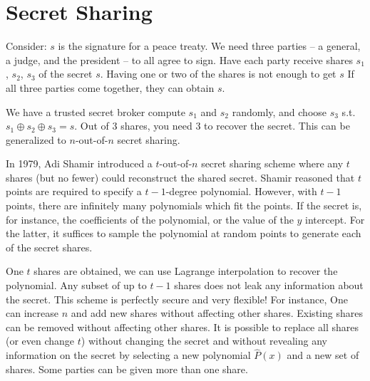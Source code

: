 \section{Secret Sharing}

Consider: $s$ is the signature for a peace treaty.
We need three parties -- a general, a
judge, and the president -- to all agree
to sign.
Have each party receive shares
$s_1$, $s_2$, $s_3$ of the secret $s$.
Having one or two of the shares is not
enough to get $s$
If all three parties come together, they
can obtain $s$.

We have a trusted secret broker compute 
$s_1$ and $s_2$ randomly, and choose 
$s_3$ s.t. $s_1 \oplus s_2 \oplus s_3 = s$. 
Out of 3 shares, you need 3 to recover the secret.
This can be generalized to $n$-out-of-$n$ secret 
sharing. 

In 1979, Adi Shamir introduced a
$t$-out-of-$n$ secret sharing scheme where
any $t$ shares (but no fewer) could 
reconstruct the shared secret. 
Shamir reasoned that $t$ points 
are required to specify a $t - 1$-degree 
polynomial. However, with $t-1$ points, 
there are infinitely many polynomials 
which fit the points. If the secret is, 
for instance, the coefficients of the 
polynomial, or the value of the $y$ 
intercept. For the latter, it suffices 
to sample the polynomial at random 
points to generate each of the secret 
shares. 

One $t$ shares are obtained, we can 
use Lagrange interpolation to 
recover the polynomial. 
Any subset of up to $t - 1$ shares does not leak 
any information about the secret.
This scheme is perfectly secure and 
very flexible! For instance, 
One can increase $n$ and add new shares 
without affecting other shares.
Existing shares can be removed without 
affecting other shares.
It is possible to replace all shares 
(or even change $t$) without changing the secret
and without revealing any information on the 
secret by selecting a new polynomial
$\hat{P}(x)$ and a new set of shares.
Some parties can be given more than one share.